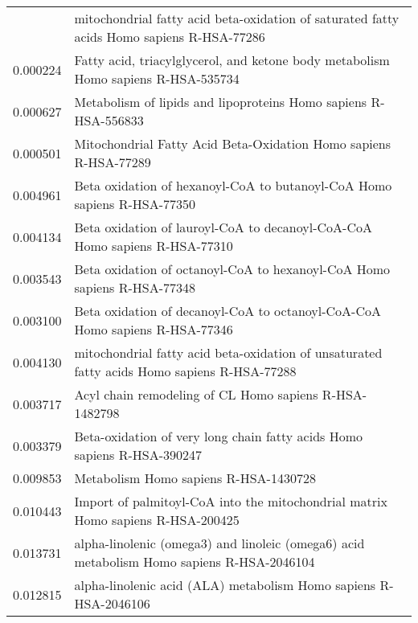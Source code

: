 \begin{longtable}{p{2.4cm}p{14.5cm}}
\bottomrule
\endlastfoot
                 0.000166 &    mitochondrial fatty acid beta-oxidation of saturated fatty acids Homo sapiens R-HSA-77286 \\
                 0.000224 &            Fatty acid, triacylglycerol, and ketone body metabolism Homo sapiens R-HSA-535734 \\
                 0.000627 &                              Metabolism of lipids and lipoproteins Homo sapiens R-HSA-556833 \\
                 0.000501 &                             Mitochondrial Fatty Acid Beta-Oxidation Homo sapiens R-HSA-77289 \\
                 0.004961 &                      Beta oxidation of hexanoyl-CoA to butanoyl-CoA Homo sapiens R-HSA-77350 \\
                 0.004134 &                   Beta oxidation of lauroyl-CoA to decanoyl-CoA-CoA Homo sapiens R-HSA-77310 \\
                 0.003543 &                      Beta oxidation of octanoyl-CoA to hexanoyl-CoA Homo sapiens R-HSA-77348 \\
                 0.003100 &                  Beta oxidation of decanoyl-CoA to octanoyl-CoA-CoA Homo sapiens R-HSA-77346 \\
                 0.004130 &  mitochondrial fatty acid beta-oxidation of unsaturated fatty acids Homo sapiens R-HSA-77288 \\
                 0.003717 &                                       Acyl chain remodeling of CL Homo sapiens R-HSA-1482798 \\
                 0.003379 &                      Beta-oxidation of very long chain fatty acids Homo sapiens R-HSA-390247 \\
                 0.009853 &                                                        Metabolism Homo sapiens R-HSA-1430728 \\
                 0.010443 &              Import of palmitoyl-CoA into the mitochondrial matrix Homo sapiens R-HSA-200425 \\
                 0.013731 &    alpha-linolenic (omega3) and linoleic (omega6) acid metabolism Homo sapiens R-HSA-2046104 \\
                 0.012815 &                             alpha-linolenic acid (ALA) metabolism Homo sapiens R-HSA-2046106 \\
\end{longtable}


